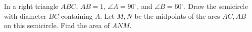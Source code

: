 In a right triangle $ABC$, $AB=1$, $\angle A=90^\circ$, and $\angle B=60^\circ$. Draw the semicircle with diameter $BC$ containing $A$. Let $M,N$ be the midpoints of the arcs $AC,AB$ on this semicircle. Find the area of $ANM$.
